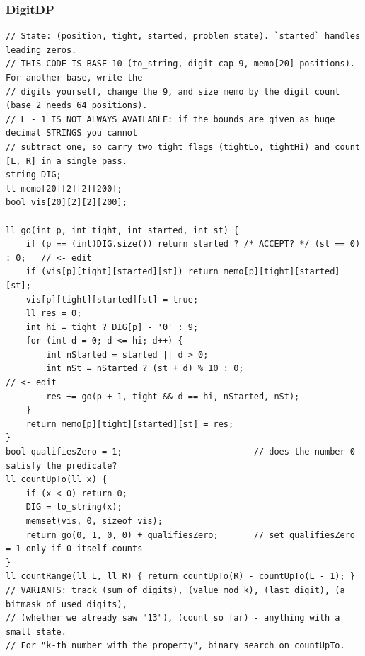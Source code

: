 \documentclass[9pt,a4paper,twocolumn]{extarticle}
\begin{document}
\subsubsection{DigitDP}
\nopagebreak
\begin{lstlisting}
// State: (position, tight, started, problem state). `started` handles leading zeros.
// THIS CODE IS BASE 10 (to_string, digit cap 9, memo[20] positions). For another base, write the
// digits yourself, change the 9, and size memo by the digit count (base 2 needs 64 positions).
// L - 1 IS NOT ALWAYS AVAILABLE: if the bounds are given as huge decimal STRINGS you cannot
// subtract one, so carry two tight flags (tightLo, tightHi) and count [L, R] in a single pass.
string DIG;
ll memo[20][2][2][200];
bool vis[20][2][2][200];

ll go(int p, int tight, int started, int st) {
    if (p == (int)DIG.size()) return started ? /* ACCEPT? */ (st == 0) : 0;   // <- edit
    if (vis[p][tight][started][st]) return memo[p][tight][started][st];
    vis[p][tight][started][st] = true;
    ll res = 0;
    int hi = tight ? DIG[p] - '0' : 9;
    for (int d = 0; d <= hi; d++) {
        int nStarted = started || d > 0;
        int nSt = nStarted ? (st + d) % 10 : 0;                               // <- edit
        res += go(p + 1, tight && d == hi, nStarted, nSt);
    }
    return memo[p][tight][started][st] = res;
}
bool qualifiesZero = 1;                          // does the number 0 satisfy the predicate?
ll countUpTo(ll x) {
    if (x < 0) return 0;
    DIG = to_string(x);
    memset(vis, 0, sizeof vis);
    return go(0, 1, 0, 0) + qualifiesZero;       // set qualifiesZero = 1 only if 0 itself counts
}
ll countRange(ll L, ll R) { return countUpTo(R) - countUpTo(L - 1); }
// VARIANTS: track (sum of digits), (value mod k), (last digit), (a bitmask of used digits),
// (whether we already saw "13"), (count so far) - anything with a small state.
// For "k-th number with the property", binary search on countUpTo.
\end{lstlisting}

\filbreak
\end{document}
